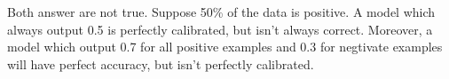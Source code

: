 \begin{answer}
    Both answer are not true.   
    Suppose 50\% of the data is positive. A model which always output 0.5 is perfectly calibrated,
    but isn't always correct. Moreover, a model which output 0.7 for all positive examples and 0.3 for negtivate examples
    will have perfect accuracy, but isn't perfectly calibrated. 
\end{answer}

